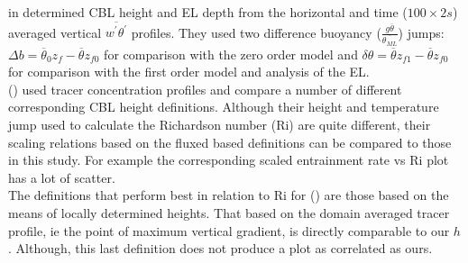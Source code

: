 

\citeauthor{FedConzMir04} in \cite{FedConzMir04} determined \acs{CBL} height and \acs{EL} depth from the horizontal and time ($100 \times 2s$) averaged vertical $\overline{w^{'}\theta^{'}}$ profiles.  They used two difference buoyancy ($\frac{g\overline{\theta}}{\overline{\theta_{ML}}}$) jumps: $\Delta b = \overline{\theta}_{0}z_{f} - \overline{\theta}z_{f0}$ for comparison with the zero order model and $\delta \theta = \overline{\theta}z_{f1} - \overline{\theta}z_{f0}$ for comparison with the first order model and analysis of the \acs{EL}.\\  


\citeauthor{BrooksFowler2} (\cite{BrooksFowler2}) used tracer concentration profiles and compare a number of different corresponding \acs{CBL} height definitions.  Although their height and temperature jump used to calculate the Richardson number (\acs{Ri}) are quite different, their scaling relations based on the fluxed based definitions can be compared to those in this study. For example the corresponding scaled entrainment rate vs \acs{Ri} plot has a lot of scatter.\\

The definitions that perform best in relation to \acs{Ri} for \citeauthor{BrooksFowler2} (\cite{BrooksFowler2}) are those based on the means of locally determined heights.  That based on the domain averaged tracer profile, ie the point of maximum vertical gradient, is directly comparable to our $h$. Although, this last definition does not produce a plot as correlated as ours.\\  

